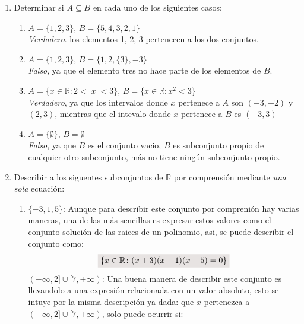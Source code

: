 \documentclass[a4paper,11pt]{article}
\newcommand{\real}{\mathbb{R}}
\newcommand{\resalta}[1]{\colorbox{g}{$\displaystyle #1$}}
\begin{document}
\begin{enumerate}
\begin{enumerate}[label = \roman*)]
        \end{enumerate}
        \newpage
        \item Determinar si $A \subseteq B$ en cada uno de los siguientes casos:
        \begin{enumerate}[label = \roman*)]
                \item $A=\{1,2,3\}$, $B=\{5,4,3,2,1\}$\\
                    \colorbox{g}{\textit{Verdadero}}. los elementos 1, 2, 3 pertenecen a los dos conjuntos.
                 \item $A=\{1,2,3\}$, $B=\{1,2,\{3\},-3\}$\\
                    \colorbox{g}{\textit{Falso}}, ya que el elemento tres no hace parte de los elementos de $B$.
                \item $A=\{x\in \mathbb{R} \colon 2<|x|<3\}$, $B=\{x\in \mathbb{R}\colon x^{2}<3\}$\\
                    \colorbox{g}{\textit{Verdadero}}, ya que los intervalos donde $x$ pertenece a $A$ son $(-3,-2)$ y $(2,3)$, mientras que el intevalo donde $x$ pertenece a $B$ es $(-3,3)$
                \item $A=\{\emptyset\}$, $B=\emptyset$\\
                    \colorbox{g}{\textit{Falso}}, ya que $B$ es el conjunto vacio, $B$ es subconjunto propio de cualquier otro subconjunto, m\'as no tiene ning\'un subconjunto propio.
        \end{enumerate}
        \item Describir a los siguentes subconjuntos de $\real$ por comprensi\'on mediante \textit{una sola} ecuaci\'on:
        \begin{enumerate}[label = \roman*)]
            \item $\{-3,1,5\}$: 
            Aunque para describir este conjunto por compreni\'on hay varias maneras, una de las m\'as sencillas es expresar estos valores como el conjunto soluci\'on de las raices de un polinomio, asi, se puede describir el conjunto como:
            \begin{equation}
                \notag \resalta{\{x\in \mathbb{R}\colon (x+3)(x-1)(x-5)=0\}}
            \end{equation}
            $(-\infty,2]\cup[7,+\infty)$: Una buena manera de describir este conjunto es llevandolo a una expresi\'on relacionada con un valor absoluto, esto se intuye por la misma descripci\'on ya dada: que $x$ pertenezca a $(-\infty,2]\cup[7,+\infty)$, solo puede ocurrir si:

\end{enumerate}
\end{enumerate}
\end{document}
